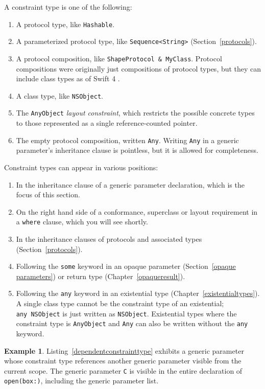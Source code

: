 \documentclass[a4paper,headsepline,bibliography=totoc,toc=flat,fleqn,twoside=semi]{scrbook}
\theoremstyle{definition}
\theoremstyle{definition}
\newtheorem{example}{Example}[chapter]
\theoremstyle{definition}
\begin{document}
A constraint type is one of the following:
\begin{enumerate}
\item A protocol type, like \texttt{Hashable}.
\item A parameterized protocol type, like \texttt{Sequence<String>} (Section~\ref{protocols}).
\item A protocol composition, like \texttt{ShapeProtocol \& MyClass}. Protocol compositions were originally just compositions of protocol types, but they can include class types as of Swift 4 \cite{se0156}.
\item A class type, like \texttt{NSObject}.
\item The \texttt{AnyObject} \emph{layout constraint}, which restricts the possible concrete types to those represented as a single reference-counted pointer.
\item The empty protocol composition, written \texttt{Any}. Writing \texttt{Any} in a generic parameter's inheritance clause is pointless, but it is allowed for completeness.
\end{enumerate}
Constraint types can appear in various positions:
\begin{enumerate}
\item In the inheritance clause of a generic parameter declaration, which is the focus of this section.
\item On the right hand side of a conformance, superclass or layout requirement in a \texttt{where} clause, which you will see shortly.
\item In the inheritance clauses of protocols and associated types (Section~\ref{protocols}).
\item Following the \texttt{some} keyword in an opaque parameter (Section~\ref{opaque parameters}) or return type (Chapter~\ref{opaqueresult}).
\item Following the \texttt{any} keyword in an existential type (Chapter~\ref{existentialtypes}). A single class type cannot be the constraint type of an existential; \texttt{any~NSObject} is just written as \texttt{NSObject}. Existential types where the constraint type is \texttt{AnyObject} and \texttt{Any} can also be written without the \texttt{any} keyword.
\end{enumerate}
\begin{example}
Listing~\ref{dependentconstrainttype} exhibits a generic parameter whose constraint type references another generic parameter visible from the current scope. The generic parameter \texttt{C} is visible in the entire declaration of \texttt{open(box:)}, including the generic parameter list.
\end{example}
\end{document}
